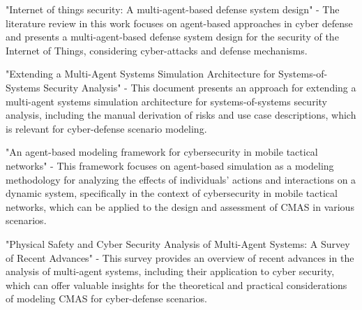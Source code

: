 \documentclass[conference]{IEEEtran}
\begin{document}



"Internet of things security: A multi-agent-based defense system design" - The literature review in this work focuses on agent-based approaches in cyber defense and presents a multi-agent-based defense system design for the security of the Internet of Things, considering cyber-attacks and defense mechanisms\cite{aydin2023}.

"Extending a Multi-Agent Systems Simulation Architecture for Systems-of-Systems Security Analysis" - This document presents an approach for extending a multi-agent systems simulation architecture for systems-of-systems security analysis, including the manual derivation of risks and use case descriptions, which is relevant for cyber-defense scenario modeling\cite{elhachem2018}.

"An agent-based modeling framework for cybersecurity in mobile tactical networks" - This framework focuses on agent-based simulation as a modeling methodology for analyzing the effects of individuals' actions and interactions on a dynamic system, specifically in the context of cybersecurity in mobile tactical networks, which can be applied to the design and assessment of CMAS in various scenarios\cite{thompson2018}.

"Physical Safety and Cyber Security Analysis of Multi-Agent Systems: A Survey of Recent Advances" - This survey provides an overview of recent advances in the analysis of multi-agent systems, including their application to cyber security, which can offer valuable insights for the theoretical and practical considerations of modeling CMAS for cyber-defense scenarios\cite{dan2021}.
\end{document}
